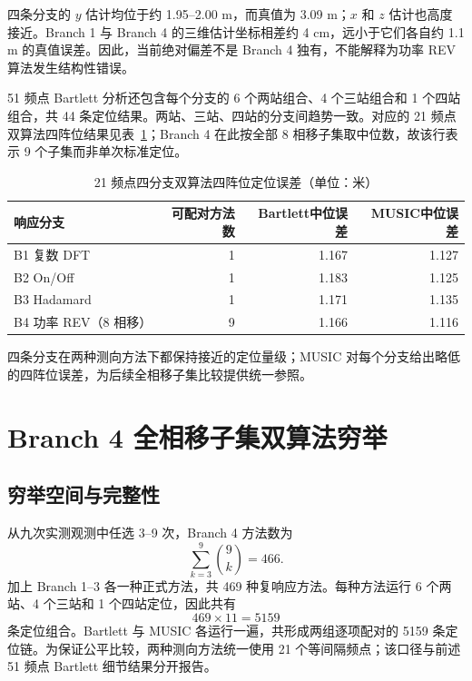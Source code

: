 \documentclass[UTF8,12pt,a4paper]{ctexart}
\begin{document}
四条分支的 $y$ 估计均位于约 1.95--2.00 m，而真值为 3.09 m；$x$ 和 $z$ 估计也高度接近。Branch 1 与 Branch 4 的三维估计坐标相差约 4 cm，远小于它们各自约 1.1 m 的真值误差。因此，当前绝对偏差不是 Branch 4 独有，不能解释为功率 REV 算法发生结构性错误。

51 频点 Bartlett 分析还包含每个分支的 6 个两站组合、4 个三站组合和 1 个四站组合，共 44 条定位结果。两站、三站、四站的分支间趋势一致。对应的 21 频点双算法四阵位结果见表~\ref{tab:branch-pair}；Branch 4 在此按全部 8 相移子集取中位数，故该行表示 9 个子集而非单次标准定位。

\begin{table}[H]
  \centering
  \caption{21 频点四分支双算法四阵位定位误差（单位：米）}
  \label{tab:branch-pair}
  \begin{tabular}{lrrr}
    \toprule
    响应分支 & 可配对方法数 & Bartlett中位误差 & MUSIC中位误差 \\
    \midrule
    B1 复数 DFT & 1 & 1.167 & 1.127 \\
    B2 On/Off & 1 & 1.183 & 1.125 \\
    B3 Hadamard & 1 & 1.171 & 1.135 \\
    B4 功率 REV（8 相移） & 9 & 1.166 & 1.116 \\
    \bottomrule
  \end{tabular}
\end{table}

四条分支在两种测向方法下都保持接近的定位量级；MUSIC 对每个分支给出略低的四阵位误差，为后续全相移子集比较提供统一参照。

\section{Branch 4 全相移子集双算法穷举}

\subsection{穷举空间与完整性}

从九次实测观测中任选 3--9 次，Branch 4 方法数为
\begin{equation}
  \sum_{k=3}^{9}\binom{9}{k}=466.
\end{equation}
加上 Branch 1--3 各一种正式方法，共 469 种复响应方法。每种方法运行 6 个两站、4 个三站和 1 个四站定位，因此共有
\begin{equation}
  469\times 11=5159
\end{equation}
条定位组合。Bartlett 与 MUSIC 各运行一遍，共形成两组逐项配对的 5159 条定位链。为保证公平比较，两种测向方法统一使用 21 个等间隔频点；该口径与前述 51 频点 Bartlett 细节结果分开报告。
\end{document}

